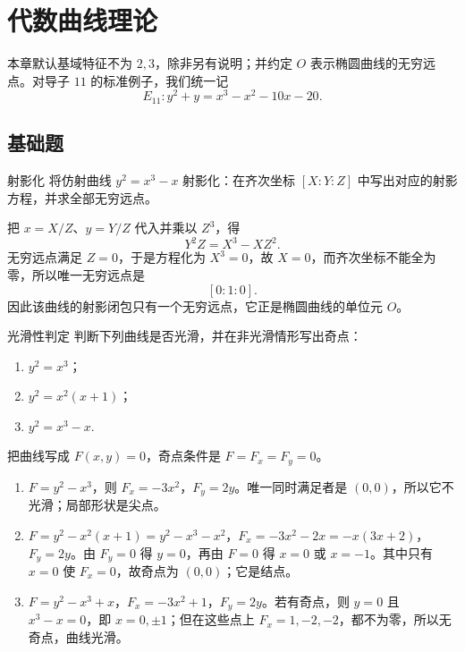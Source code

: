 \chapter{代数曲线理论}

本章默认基域特征不为 $2,3$，除非另有说明；并约定 $O$ 表示椭圆曲线的无穷远点。对导子 $11$ 的标准例子，我们统一记
\[
E_{11}: y^2+y=x^3-x^2-10x-20.
\]

\difficultykey

\section*{基础题}

\begin{problem}{射影化 \easy}
将仿射曲线 $y^2=x^3-x$ 射影化：在齐次坐标 $[X:Y:Z]$ 中写出对应的射影方程，并求全部无穷远点。
\end{problem}
\begin{solution}
把 $x=X/Z$、$y=Y/Z$ 代入并乘以 $Z^3$，得
\[
Y^2Z=X^3-XZ^2.
\]
无穷远点满足 $Z=0$，于是方程化为 $X^3=0$，故 $X=0$，而齐次坐标不能全为零，所以唯一无穷远点是
\[
[0:1:0].
\]
因此该曲线的射影闭包只有一个无穷远点，它正是椭圆曲线的单位元 $O$。
\end{solution}

\begin{problem}{光滑性判定 \easy}
判断下列曲线是否光滑，并在非光滑情形写出奇点：
\begin{enumerate}[label=(\alph*)]
  \item $y^2=x^3$；
  \item $y^2=x^2(x+1)$；
  \item $y^2=x^3-x$.
\end{enumerate}
\end{problem}
\begin{solution}
把曲线写成 $F(x,y)=0$，奇点条件是 $F=F_x=F_y=0$。
\begin{enumerate}[label=(\alph*)]
  \item $F=y^2-x^3$，则 $F_x=-3x^2$，$F_y=2y$。唯一同时满足者是 $(0,0)$，所以它不光滑；局部形状是尖点。
  \item $F=y^2-x^2(x+1)=y^2-x^3-x^2$，$F_x=-3x^2-2x=-x(3x+2)$，$F_y=2y$。由 $F_y=0$ 得 $y=0$，再由 $F=0$ 得 $x=0$ 或 $x=-1$。其中只有 $x=0$ 使 $F_x=0$，故奇点为 $(0,0)$；它是结点。
  \item $F=y^2-x^3+x$，$F_x=-3x^2+1$，$F_y=2y$。若有奇点，则 $y=0$ 且 $x^3-x=0$，即 $x=0,\pm1$；但在这些点上 $F_x=1,-2,-2$，都不为零，所以无奇点，曲线光滑。
\end{enumerate}
\end{solution}

